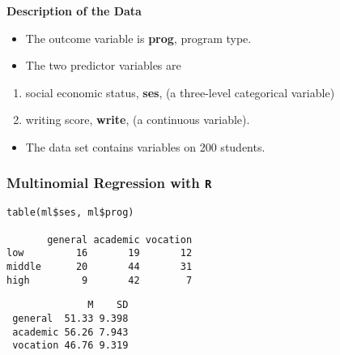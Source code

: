 \documentclass[00-GLMregslides.tex]{subfiles}
\begin{document}
\begin{frame}[fragile]
\Large	
	\textbf{Description of the Data}
\begin{itemize}
\item The outcome variable is \textbf{prog}, program type. 
\item The two predictor variables are
\end{itemize}
{ \Large
\begin{enumerate}
 \item social economic status, \textbf{ses}, (a three-level categorical variable) 
 \item writing score, \textbf{write}, (a continuous variable).
\end{enumerate} 
}
\begin{itemize}
\item The data set contains variables on 200 students.
\end{itemize}
\end{frame} 
\begin{frame}[fragile]
\Large
\frametitle{Multinomial Regression with \texttt{R}}
\Large

\begin{verbatim}
table(ml$ses, ml$prog)

       general academic vocation
low         16       19       12
middle      20       44       31
high         9       42        7
\end{verbatim} 
 
\begin{verbatim} 
              M    SD
 general  51.33 9.398
 academic 56.26 7.943
 vocation 46.76 9.319
\end{verbatim} 

\end{frame}
%
\end{document}
